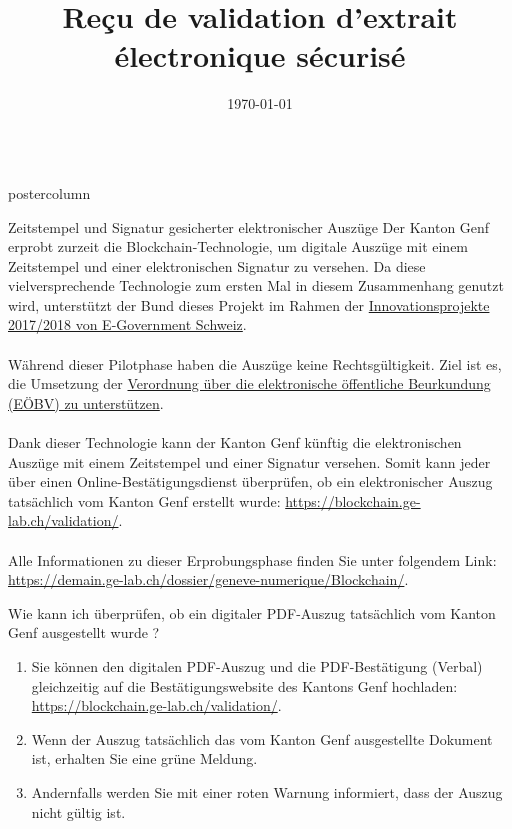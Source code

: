 \documentclass[roundedcorners=true, titleposition=center]{beamerthemeruhuisstijlposter}
\title{Reçu de validation d’extrait électronique sécurisé}
\date{\today}
\begin{document}
\begin{frame}
\begin{columns}
\begin{column}{0.95\textwidth}
\begin{beamercolorbox}[center, wd=\textwidth]{postercolumn}
\begin{minipage}[T]{0.95\textwidth}
\parbox[t][\columnheight]{\textwidth}{%
\begin{block}{Zeitstempel und Signatur gesicherter elektronischer Auszüge}
Der Kanton Genf erprobt zurzeit die Blockchain-Technologie, um digitale Auszüge mit einem Zeitstempel und einer elektronischen Signatur zu versehen. Da diese vielversprechende Technologie zum ersten Mal in diesem Zusammenhang genutzt wird, unterstützt der Bund dieses Projekt im Rahmen der \href{https://www.egovernment.ch/fr/umsetzung/innovationen/innovations-20172018/}{Innovationsprojekte 2017/2018 von E-Government Schweiz}.
\\
\\
Während dieser Pilotphase haben die Auszüge keine Rechtsgültigkeit. Ziel ist es, die Umsetzung der \href{https://www.admin.ch/opc/fr/classified-compilation/20111505/201701010000/943.033.pdf}{Verordnung über die elektronische öffentliche Beurkundung (EÖBV) zu unterstützen}.
\\
\\
Dank dieser Technologie kann der Kanton Genf künftig die elektronischen Auszüge mit einem Zeitstempel und einer Signatur versehen. Somit kann jeder über einen Online-Bestätigungsdienst überprüfen, ob ein elektronischer Auszug tatsächlich vom Kanton Genf erstellt wurde: \href{https://blockchain.ge-lab.ch/validation/}{https://blockchain.ge-lab.ch/validation/}.
\\
\\
Alle Informationen zu dieser Erprobungsphase finden Sie unter folgendem Link: \href{https://demain.ge-lab.ch/dossier/geneve-numerique/Blockchain/}{https://demain.ge-lab.ch/dossier/geneve-numerique/Blockchain/}.
\end{block}
\medskip
\begin{block}{Wie kann ich überprüfen, ob ein digitaler PDF-Auszug tatsächlich vom Kanton Genf ausgestellt wurde ?}
\begin{enumerate}
\item Sie können den digitalen PDF-Auszug und die PDF-Bestätigung (Verbal) gleichzeitig auf die Bestätigungswebsite des Kantons Genf hochladen: \href{https://blockchain.ge-lab.ch/validation/}{https://blockchain.ge-lab.ch/validation/}.
\item Wenn der Auszug tatsächlich das vom Kanton Genf ausgestellte Dokument ist, erhalten Sie eine grüne Meldung.
\item Andernfalls werden Sie mit einer roten Warnung informiert, dass der Auszug nicht gültig ist.
\end{enumerate}
\end{block}
}
\end{minipage}
\end{beamercolorbox}
\end{column}
\end{columns}
\end{frame}
\end{document}
